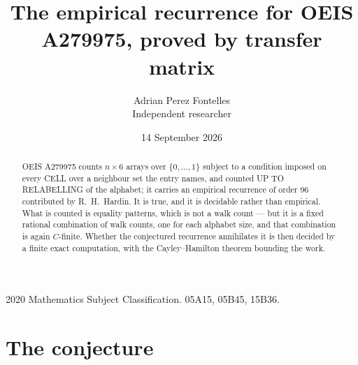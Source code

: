 \documentclass[11pt,a4paper]{article}
\title{The empirical recurrence for OEIS A279975, proved by transfer matrix}
\author{Adrian Perez Fontelles\\ \small Independent researcher}
\date{14 September 2026}
\theoremstyle{plain}
\theoremstyle{definition}
\begin{document}
\maketitle

\begin{abstract}
OEIS A279975 counts $n\times6$ arrays over $\{0,\dots,1\}$ subject to a condition imposed on
every CELL over a neighbour set the entry names, and counted UP TO RELABELLING of the
alphabet; it carries an empirical recurrence of order $96$ contributed by
R.~H.~Hardin. It is true, and it is decidable rather than empirical. What is counted is
equality patterns, which is not a walk count --- but it is a fixed rational combination of
walk counts, one for each alphabet size, and that combination is again $C$-finite. Whether the
conjectured recurrence annihilates it is then decided by a finite exact computation, with the
Cayley--Hamilton theorem bounding the work.
\end{abstract}

\noindent\small 2020 Mathematics Subject Classification. 05A15, 05B45, 15B36.\normalsize

\section{The conjecture}
\end{document}
